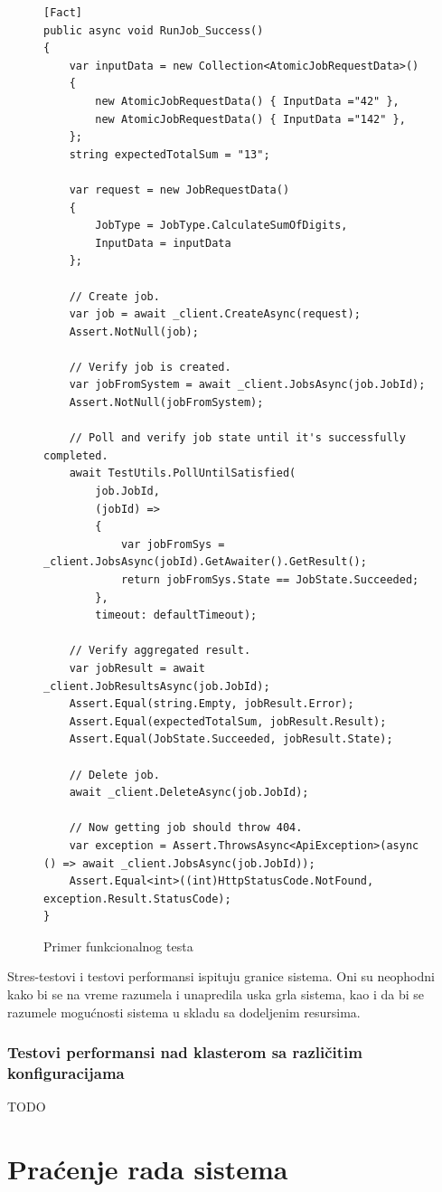 \documentclass[12pt,oneside]{memoir}
\begin{document}
\begin{figure}[h!]
\centering
\begin{lstlisting}
[Fact]
public async void RunJob_Success()
{
	var inputData = new Collection<AtomicJobRequestData>()
	{
		new AtomicJobRequestData() { InputData ="42" },
		new AtomicJobRequestData() { InputData ="142" },
	};
	string expectedTotalSum = "13";

	var request = new JobRequestData()
	{
		JobType = JobType.CalculateSumOfDigits,
		InputData = inputData
	};

	// Create job.
	var job = await _client.CreateAsync(request);
	Assert.NotNull(job);

	// Verify job is created.
	var jobFromSystem = await _client.JobsAsync(job.JobId);
	Assert.NotNull(jobFromSystem);

	// Poll and verify job state until it's successfully completed.
	await TestUtils.PollUntilSatisfied(
		job.JobId,
		(jobId) =>
		{
			var jobFromSys = _client.JobsAsync(jobId).GetAwaiter().GetResult();
			return jobFromSys.State == JobState.Succeeded;
		},
		timeout: defaultTimeout);

	// Verify aggregated result.
	var jobResult = await _client.JobResultsAsync(job.JobId);
	Assert.Equal(string.Empty, jobResult.Error);
	Assert.Equal(expectedTotalSum, jobResult.Result);
	Assert.Equal(JobState.Succeeded, jobResult.State);

	// Delete job.
	await _client.DeleteAsync(job.JobId);

	// Now getting job should throw 404.
	var exception = Assert.ThrowsAsync<ApiException>(async () => await _client.JobsAsync(job.JobId));
	Assert.Equal<int>((int)HttpStatusCode.NotFound, exception.Result.StatusCode);
}
\end{lstlisting}
\caption{Primer funkcionalnog testa}
\label{fig:teste2e}
\end{figure}

Stres-testovi i testovi performansi ispituju granice sistema. Oni su neophodni kako bi se na vreme razumela i unapredila uska grla sistema, kao i da bi se razumele mogućnosti sistema u skladu sa dodeljenim resursima.

\subsubsection{Testovi performansi nad klasterom sa različitim konfiguracijama}
TODO


\section{Praćenje rada sistema}
\label{chp:pracenjemetrika}
\end{document}
